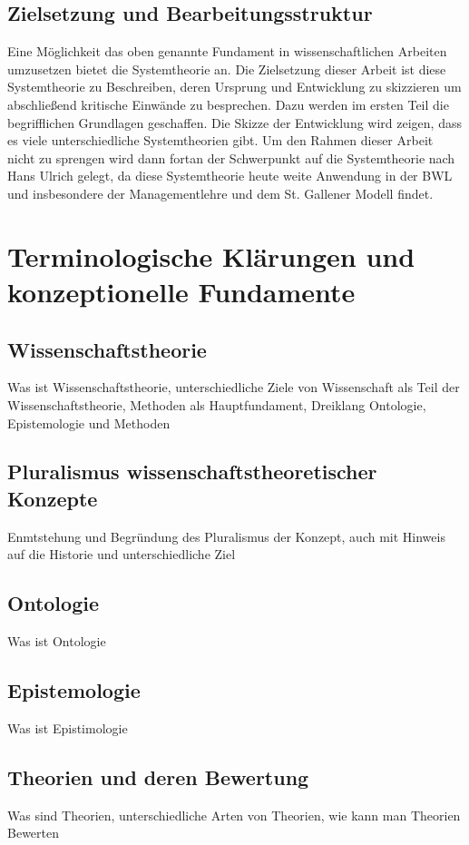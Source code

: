 \documentclass[a4paper,12pt]{article}
\begin{document}
\subsection{Zielsetzung und Bearbeitungsstruktur}
Eine Möglichkeit das oben genannte Fundament in wissenschaftlichen Arbeiten umzusetzen bietet die Systemtheorie an. Die Zielsetzung dieser Arbeit ist diese Systemtheorie zu Beschreiben, deren Ursprung und Entwicklung zu skizzieren um abschließend kritische Einwände zu besprechen. Dazu werden im ersten Teil die begrifflichen Grundlagen geschaffen. Die Skizze der Entwicklung wird zeigen, dass es viele unterschiedliche Systemtheorien gibt. Um den Rahmen dieser Arbeit nicht zu sprengen wird dann fortan der Schwerpunkt auf die Systemtheorie nach Hans Ulrich gelegt, da diese Systemtheorie heute weite Anwendung in der BWL und insbesondere der Managementlehre und dem St. Gallener Modell findet.


\section{Terminologische Klärungen und konzeptionelle Fundamente}
\subsection{Wissenschaftstheorie}
Was ist Wissenschaftstheorie, unterschiedliche Ziele von Wissenschaft als Teil der Wissenschaftstheorie, Methoden als Hauptfundament, Dreiklang Ontologie, Epistemologie und Methoden
\subsection{Pluralismus wissenschaftstheoretischer Konzepte}
Enmtstehung und Begründung des Pluralismus der Konzept, auch mit Hinweis auf die Historie und unterschiedliche Ziel
\subsection{Ontologie}
Was ist Ontologie
\subsection{Epistemologie}
Was ist Epistimologie

\subsection{Theorien und deren Bewertung}
Was sind Theorien, unterschiedliche Arten von Theorien, wie kann man Theorien Bewerten
\end{document}

